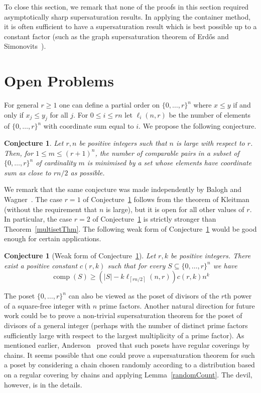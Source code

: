 \documentclass[11 pt]{article}
\newtheorem{conj}[equation]{Conjecture}
\theoremstyle{definition}
\theoremstyle{case}
\numberwithin{equation}{section}
\DeclareMathOperator{\comp}{comp}
\begin{document}
To close this section, we remark that none of the proofs in this section required asymptotically sharp supersaturation results. In applying the container method, it is often sufficient to have a supersaturation result which is best possible up to a constant factor (such as the graph supersaturation theorem of Erd\H{o}s and Simonovits~\cite{Hyper}).

\section{Open Problems}
\label{concl}

For general $r\geq1$ one can define a partial order on $\{0,\dots,r\}^n$ where $x\leq y$ if and only if $x_j\leq y_j$ for all $j$. For $0\leq i\leq rn$ let $\ell_i(n,r)$ be the number of elements of $\{0,\dots,r\}^n$ with coordinate sum equal to $i$. We propose the following conjecture. 

\begin{conj}
\label{middleLevels}
Let $r,n$ be positive integers such that $n$ is large with respect to $r$. Then, for $1\leq m\leq (r+1)^n$, the number of comparable pairs in a subset of $\{0,\dots,r\}^n$ of cardinality $m$ is minimised by a set whose elements have coordinate sum as close to $rn/2$ as possible. 
\end{conj}

We remark that the same conjecture was made independently by Balogh and Wagner~\cite{BaloghWagnerKleitman}. The case $r=1$ of Conjecture~\ref{middleLevels} follows from the theorem of Kleitman~\cite{superKleitman} (without the requirement that $n$ is large), but it is open for all other values of $r$. In particular, the case $r=2$ of Conjecture~\ref{middleLevels} is strictly stronger than Theorem~\ref{multisetThm}. The following weak form of Conjecture~\ref{middleLevels} would be good enough for certain applications.

\begin{conj}
[Weak form of Conjecture~\ref{middleLevels}]
Let $r,k$ be positive integers. There exist a positive constant $c(r,k)$ such that for every $S\subseteq \{0,\dots,r\}^n$ we have
\[\comp(S)\geq \left(|S|-k\ell_{\left\lceil rn/2\right\rceil}(n,r)\right)c(r,k)n^k\]
\end{conj}

The poset $\{0,\dots,r\}^n$ can also be viewed as the poset of divisors of the $r$th power of a square-free integer with $n$ prime factors. Another natural direction for future work could be to prove a non-trivial supersaturation theorem for the poset of divisors of a general integer (perhaps with the number of distinct prime factors sufficiently large with respect to the largest multiplicity of a prime factor). As mentioned earlier, Anderson~\cite{Andersondivisors} proved that such posets have regular coverings by chains. It seems possible that one could prove a supersaturation theorem for such a poset by considering a chain chosen randomly according to a distribution based on a regular covering by chains and applying Lemma~\ref{randomCount}. The devil, however, is in the details.
\end{document}
